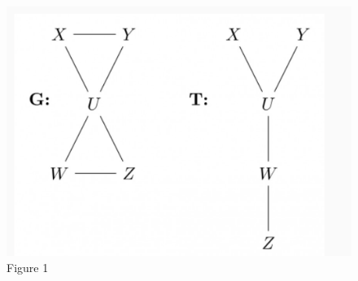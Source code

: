 \documentclass[journal,12pt,twocolumn]{IEEEtran}
\begin{document}
\begin{figure}
    \centering
    \includegraphics[scale=0.6]{assignment1.png}
    \caption{Figure 1}
    \label{fig: figure1}
\end{figure}
\end{document}
